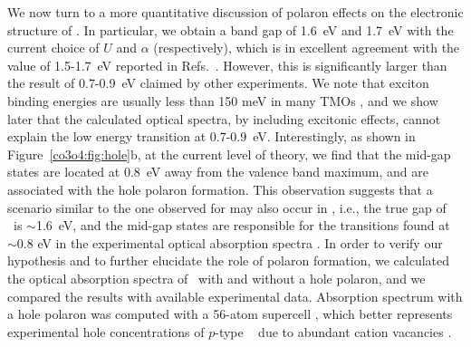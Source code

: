 We now turn to a more quantitative discussion of polaron effects on the electronic structure of \co. In particular, we obtain a band gap of 1.6~eV and 1.7~eV with the current choice of $U$ and $\alpha$ (respectively), which is in excellent agreement with the value of 1.5-1.7~eV reported in Refs.~\cite{lohaus2016,jiang2014,waegele2014,shinde2006,belova1983,lima2014,cheng1998}. However, this is significantly larger than the result of 0.7-0.9~eV claimed by other experiments. \cite{qiao2013,singh2014,sousa2019,martens1985}
We note that exciton binding energies are usually less than 150 meV in many TMOs \cite{ping20132,le2014,Ping2013}, and we show later that the calculated optical spectra, by including excitonic effects, cannot explain the low energy transition at 0.7-0.9~eV.
Interestingly, as shown in Figure~\ref{co3o4:fig:hole}b, at the current level of theory, we find that the mid-gap states are located at 0.8~eV away from the valence band maximum, and are associated with the hole polaron formation. This observation suggests that a scenario similar to the one observed for  may also occur in \co, i.e., the true gap of \co\ is $\sim$1.6~eV, and the mid-gap states are responsible for the transitions found at $\sim$0.8 eV in the experimental optical absorption spectra \cite{qiao2013,singh2014,sousa2019,martens1985}.
In order to verify our hypothesis and to further elucidate the role of polaron formation, we calculated the optical absorption spectra of \co\ with and without a hole polaron, and we compared the results with available experimental data. Absorption spectrum with a hole polaron was computed with a 56-atom supercell \cite{concentrationNote}, which better represents experimental hole concentrations of $p$-type \co\ \cite{waegele2014,lohaus2016} due to abundant cation vacancies \cite{tronel2006,godillot2013}.

